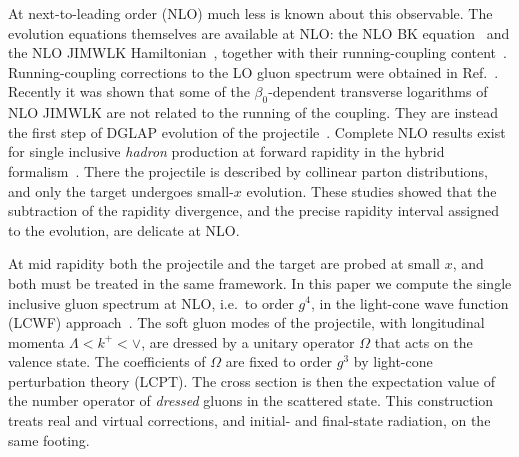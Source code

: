 \documentclass[aps,prd,onecolumn,superscriptaddress,nofootinbib,floatfix,longbibliography,11pt]{revtex4-2}
\numberwithin{equation}{section}
\begin{document}
At next-to-leading order (NLO) much less is known about this observable. The evolution equations themselves are available at NLO: the NLO BK equation~\cite{Balitsky:2007feb} and the NLO JIMWLK Hamiltonian~\cite{Balitsky:2013fea,Kovner:2013ona,Kovner:2014lca,Lublinsky:2016meo}, together with their running-coupling content~\cite{Balitsky:2006wa,Kovchegov:2006vj}. Running-coupling corrections to the LO gluon spectrum were obtained in Ref.~\cite{Horowitz:2010yg}. Recently it was shown that some of the $\beta_0$-dependent transverse logarithms of NLO JIMWLK are not related to the running of the coupling. They are instead the first step of DGLAP evolution of the projectile~\cite{Kovner:2023vsy,Altinoluk:2023hfz}. Complete NLO results exist for single inclusive \emph{hadron} production at forward rapidity in the hybrid formalism~\cite{Chirilli:2011km,Chirilli:2012jd,Stasto:2013cha,Altinoluk:2014eka,Ducloue:2016shw,Iancu:2016vyg}. There the projectile is described by collinear parton distributions, and only the target undergoes small-$x$ evolution. These studies showed that the subtraction of the rapidity divergence, and the precise rapidity interval assigned to the evolution, are delicate at NLO.

At mid rapidity both the projectile and the target are probed at small $x$, and both must be treated in the same framework. In this paper we compute the single inclusive gluon spectrum at NLO, i.e.\ to order $g^4$, in the light-cone wave function (LCWF) approach~\cite{Lepage:1980fj,Brodsky:1997de,Kovner:2005nq,Kovner:2013ona,Kovner:2014lca,Lublinsky:2016meo}. The soft gluon modes of the projectile, with longitudinal momenta $\Lambda<k^+<\vee$, are dressed by a unitary operator $\Omega$ that acts on the valence state. The coefficients of $\Omega$ are fixed to order $g^3$ by light-cone perturbation theory (LCPT). The cross section is then the expectation value of the number operator of \emph{dressed} gluons in the scattered state. This construction treats real and virtual corrections, and initial- and final-state radiation, on the same footing.
\end{document}
